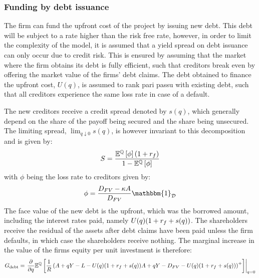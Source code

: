 \documentclass[../main.tex]{subfiles}
\begin{document}
    \subsubsection{Funding by debt issuance}
        The firm can fund the upfront cost of the project by issuing new debt.
        This debt will be subject to a rate higher than the risk free rate, 
        however, in order to limit the complexity of the model, 
        it is assumed that a yield spread on debt issuance can only occur due to credit risk. 
        This is ensured by assuming that the market where the firm obtains its debt is fully efficient, 
        such that creditors break even by offering the market value of the firms' debt claims.
        The debt obtained to finance the upfront cost, $U(q)$, is assumed to rank pari passu with existing debt, 
        such that all creditors experience the same loss rate in case of a default.

        The new creditors receive a credit spread denoted by $s(q)$,
        which generally depend on the share of the payoff being secured and the share being unsecured.
        The limiting spread, $\lim_{q\downarrow0}s(q)$,
        is however invariant to this decomposition and is given by:
            \begin{equation}
                S = \frac{
                    \mathbb{E}^{\mathbb{Q}}\left[\phi\right] 
                    (1 + r_{f})
                }{
                    1 - \mathbb{E}^{\mathbb{Q}}\left[\phi\right]
                }
            \end{equation}
        with $\phi$ being the loss rate to creditors given by:
            \begin{equation}
                \phi = \frac{
                        D_{FV} - \kappa A
                    }{
                        D_{FV}
                    } 
                \mathbbm{1}_{\mathcal{D}}
            \end{equation}
        The face value of the new debt is the upfront, which was the borrowed amount, 
        including the interest rates paid, namely 
        $U(q)(1 + r_{f} + s(q))$. 
        The shareholders receive the residual of the assets after debt claims have been paid
        unless the firm defaults, in which case the shareholders receive nothing. 
        The marginal increase in the value of the firms equity per unit investment is therefore:
            \begin{equation}
                G_{\text{debt}} = 
                \left.
                \frac{
                    \partial 
                }{
                    \partial 
                    q
                }
                \mathbb{E}^{\mathbb{Q}}\left[
                    \frac{1}{R} 
                    \left(
                        A + qY - L - U(q)(1 + r_{f} + s(q))
                        A + qY - D_{FV} - U(q)(1 + r_{f} + s(q))
                    \right)^{+}
                \right] 
                \right\rvert_{q=0} 
            \end{equation}
        
\end{document}
